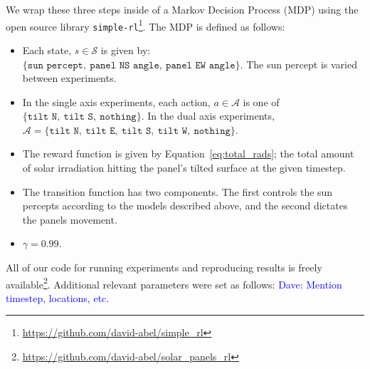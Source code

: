 \documentclass[11pt]{article}
\newcommand{\dnote}[1]{\textcolor{blue}{Dave: #1}}
\newcommand{\mc}{\mathcal}
\begin{document}
We wrap these three steps inside of a Markov Decision Process (MDP) using the open source library \texttt{simple-rl}\footnote{\url{https://github.com/david-abel/simple_rl}}. The MDP is defined as follows:
\begin{itemize}
\item Each state, $s \in \mc{S}$ is given by: $\{ \texttt{sun percept},\ \texttt{panel NS angle},\ \texttt{panel EW angle} \}$. The sun percept is varied between experiments.
\item In the single axis experiments, each action, $a \in \mc{A}$ is one of $\{\texttt{tilt N},\ \texttt{tilt S},\ \texttt{nothing}\}$. In the dual axis experiments, $\mc{A} = \{\texttt{tilt N},\ \texttt{tilt E},\ \texttt{tilt S},\ \texttt{tilt W},\ \texttt{nothing}\}$.
\item The reward function is given by Equation~\ref{eq:total_rads}; the total amount of solar irradiation hitting the panel's tilted surface at the given timestep.
\item The transition function has two components. The first controls the sun percepts according to the models described above, and the second dictates the panels movement.
\item $\gamma = 0.99$.
\end{itemize}

All of our code for running experiments and reproducing results is freely available\footnote{\url{https://github.com/david-abel/solar_panels_rl}}. Additional relevant parameters were set as follows: \dnote{Mention timestep, locations, etc.}
\end{document}
